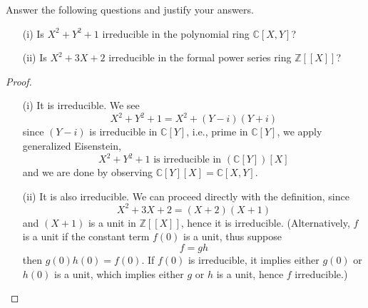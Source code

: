 \documentclass[openany]{book}
\newcommand{\Z}{\mathbb{Z}}
\newcommand{\C}{\mathbb{C}}
\begin{document}
\begin{prob}
    Answer the following questions and justify your answers.

    \begin{enumerate}
        \item[(i)] Is \( X^2 + Y^2 + 1 \) irreducible in the polynomial ring \( \mathbb{C}[X, Y] \)?
        
        \item[(ii)] Is \( X^2 + 3X + 2 \) irreducible in the formal power series ring \( \mathbb{Z}[[X]] \)?
    \end{enumerate}
\end{prob}
\begin{proof}
    \begin{enumerate}
        \item[(i)] It is irreducible. We see 
        \begin{equation*}
            X^2+Y^2+1=X^2+(Y-i)(Y+i)
        \end{equation*}
        since $(Y-i)$ is irreducible in $\C[Y]$, i.e., prime in $\C[Y]$, we apply generalized Eisenstein, 
        \begin{equation*}
            X^2+Y^2+1 \text{ is irreducible in }( \C[Y])[X]
        \end{equation*} 
        and we are done by observing $\C[Y][X]=\C[X,Y]$.
        \item[(ii)] It is also irreducible. We can proceed directly with the definition, since 
        \begin{equation*}
            X^2+3X+2=(X+2)(X+1)
        \end{equation*}
        and $(X+1)$ is a unit in $\Z[[X]]$, hence it is irreducible. (Alternatively, $f$ is a unit if the constant term $f(0)$ is a unit, thus suppose 
        \begin{equation*}
            f=gh
        \end{equation*}
        then $g(0)h(0)=f(0)$. If $f(0)$ is irreducible, it implies either $g(0)$ or $h(0)$ is a unit, which implies either $g$ or $h$ is a unit, hence $f$ irreducible.)
    \end{enumerate}
\end{proof}
\end{document}
